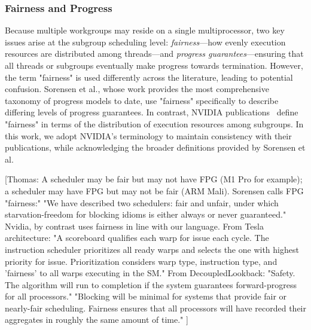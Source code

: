 \documentclass[sigconf]{acmart}
\newcommand{\thomas}[1]{{\footnotesize\color{orange}[Thomas: #1]}}
\begin{document}
\subsubsection{Fairness and Progress}
Because multiple workgroups may reside on a single multiprocessor, two key issues arise at the subgroup scheduling level: \emph{fairness}---how evenly execution resources are distributed among threads---and \emph{progress guarantees}---ensuring that all threads or subgroups eventually make progress towards termination. However, the term "fairness" is used differently across the literature, leading to potential confusion. Sorensen et al.\cite{sorensen2016,sorensen2018,sorensen2021}, whose work provides the most comprehensive taxonomy of progress models to date, use "fairness" specifically to describe differing levels of progress guarantees. In contrast, NVIDIA publications~\cite{4523358,Merrill2016} define "fairness" in terms of the distribution of execution resources among subgroups. In this work, we adopt NVIDIA's terminology to maintain consistency with their publications, while acknowledging the broader definitions provided by Sorensen et al.

\thomas{A scheduler may be fair but may not have FPG (M1 Pro for example); a scheduler may have FPG but may not be fair (ARM Mali). \newline
  Sorensen calls FPG "fairness:" "We have described two schedulers: fair and unfair, under which starvation-freedom for blocking idioms is either always or never guaranteed."\newline
  Nvidia, by contrast uses fairness in line with our language. From Tesla architecture: \newline
  "A scoreboard qualifies each warp for issue each cycle. The instruction scheduler prioritizes all ready warps and selects the one with highest priority for issue. Prioritization considers warp type, instruction type, and 'fairness' to all warps executing in the SM\@." \newline
  From DecoupledLookback: \newline
  "Safety. The algorithm will run to completion if the system guarantees forward-progress for all processors." \newline
  "Blocking will be minimal for systems that provide fair or nearly-fair scheduling. Fairness ensures that all processors will have recorded their aggregates in roughly the same amount of time."
}
\end{document}
